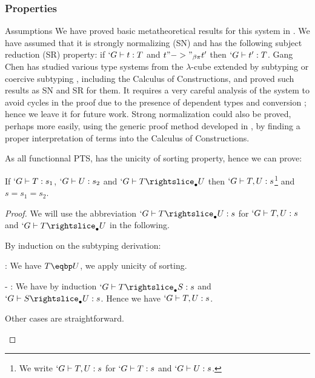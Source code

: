 \documentclass{llncs}
\begin{document}
\subsubsection{Properties}
\begin{paragraph}{Assumptions}
  We have proved basic metatheoretical results for this system in \Coq{}
  \cite{coq/Russell/meta}. We have assumed that it is strongly normalizing (SN) and has the
  following subject reduction (SR) property: if $`G \vdash t : T$ and $t
  "->"_{\beta\pi} t'$ then $`G \vdash t' : T$. Gang Chen
  \cite{ChenPhD} has studied various type systems from the
  $\lambda$-cube extended by subtyping or coercive subtyping \cite{DBLP:conf/csl/Luo96},
  including the Calculus of Constructions, and proved such results as
  SN and SR for them. It requires a very careful analysis of the system 
  to avoid cycles in the proof due to the presence of dependent types and
  conversion ; hence we leave it for future work. Strong normalization
  could also be proved, perhaps more easily, using the generic proof method developed in
  \cite{geuvers95}, by finding a proper interpretation of \Russell terms
  into the Calculus of Constructions.
\end{paragraph}

As all functionnal PTS, \Russell{} has the unicity of sorting property,
hence we can prove:
\begin{lemma}
  If $`G \vdash T : s_1$, $`G \vdash U : s_2$ and $`G \typed T \sub U$
  then $`G \vdash T, U : s$\footnote{We write $`G \vdash T, U : s$ for $`G \vdash T : s$ and $`G \vdash U :
  s$.} and $s = s_1 = s_2$.
\end{lemma}
\begin{proof}
  We will use the abbreviation $`G \typed T \sub U : s$ for $`G \vdash T,
  U : s$ and $`G \typed T \sub U$ in the following.

  By induction on the subtyping derivation:
  \begin{list}{-}
  \item {}: We have $T \eqbp U$, we apply unicity of sorting.
    
  \item[-] : We have by induction $`G \typed T \sub S : s$ and 
    $`G \typed S \sub U : s$. Hence we have $`G \vdash T, U : s$.
    
  \item Other cases are straightforward.
  \end{list}
\end{proof}
\end{document}
